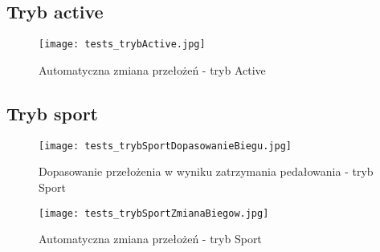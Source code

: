 \subsection{Tryb active}
\begin{figure}[h]
    \centering
    \texttt{[image: tests\_trybActive.jpg]}
    \caption{Automatyczna zmiana przełożeń - tryb Active}
    \label{fig:tests_continousChange}
\end{figure}
\subsection{Tryb sport}

\begin{figure}[h]
    \centering
    \texttt{[image: tests\_trybSportDopasowanieBiegu.jpg]}
    \caption{Dopasowanie przełożenia w wyniku zatrzymania pedałowania - tryb Sport}
    \label{fig:tests_continousChange}
\end{figure}

\begin{figure}[h]
    \centering
    \texttt{[image: tests\_trybSportZmianaBiegow.jpg]}
    \caption{Automatyczna zmiana przełożeń - tryb Sport}
    \label{fig:tests_continousChange}
\end{figure}
